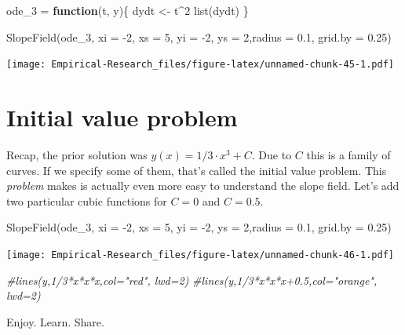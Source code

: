 \documentclass[
]{book}
\newenvironment{Shaded}{\begin{snugshade}}{\end{snugshade}}
\newcommand{\AttributeTok}[1]{\textcolor[rgb]{0.77,0.63,0.00}{#1}}
\newcommand{\CommentTok}[1]{\textcolor[rgb]{0.56,0.35,0.01}{\textit{#1}}}
\newcommand{\ControlFlowTok}[1]{\textcolor[rgb]{0.13,0.29,0.53}{\textbf{#1}}}
\newcommand{\DecValTok}[1]{\textcolor[rgb]{0.00,0.00,0.81}{#1}}
\newcommand{\FloatTok}[1]{\textcolor[rgb]{0.00,0.00,0.81}{#1}}
\newcommand{\FunctionTok}[1]{\textcolor[rgb]{0.00,0.00,0.00}{#1}}
\newcommand{\NormalTok}[1]{#1}
\newcommand{\OtherTok}[1]{\textcolor[rgb]{0.56,0.35,0.01}{#1}}
\newcommand{\SpecialCharTok}[1]{\textcolor[rgb]{0.00,0.00,0.00}{#1}}
\begin{document}
\begin{Shaded}
\begin{Highlighting}[]
\NormalTok{ode\_3 }\OtherTok{=} \ControlFlowTok{function}\NormalTok{(t, y)\{}
\NormalTok{  dydt }\OtherTok{\textless{}{-}}\NormalTok{ t}\SpecialCharTok{\^{}}\DecValTok{2}
  \FunctionTok{list}\NormalTok{(dydt)}
\NormalTok{\}}

\FunctionTok{SlopeField}\NormalTok{(ode\_3, }\AttributeTok{xi =} \SpecialCharTok{{-}}\DecValTok{2}\NormalTok{, }\AttributeTok{xs =} \DecValTok{5}\NormalTok{, }\AttributeTok{yi =} \SpecialCharTok{{-}}\DecValTok{2}\NormalTok{, }\AttributeTok{ys =} \DecValTok{2}\NormalTok{,}\AttributeTok{radius =} \FloatTok{0.1}\NormalTok{, }\AttributeTok{grid.by =} \FloatTok{0.25}\NormalTok{)}
\end{Highlighting}
\end{Shaded}

\texttt{[image: Empirical-Research\_files/figure-latex/unnamed-chunk-45-1.pdf]}

\hypertarget{initial-value-problem}{%
\section{Initial value problem}\label{initial-value-problem}}

Recap, the prior solution was \(y(x) = 1/3 \cdot x^3 + C\). Due to \(C\) this is a family of curves. If we specify some of them, that's called the initial value problem. This \emph{problem} makes is actually even more easy to understand the slope field. Let's add two particular cubic functions for \(C = 0\) and \(C = 0.5\).

\begin{Shaded}
\begin{Highlighting}[]
\FunctionTok{SlopeField}\NormalTok{(ode\_3, }\AttributeTok{xi =} \SpecialCharTok{{-}}\DecValTok{2}\NormalTok{, }\AttributeTok{xs =} \DecValTok{5}\NormalTok{, }\AttributeTok{yi =} \SpecialCharTok{{-}}\DecValTok{2}\NormalTok{, }\AttributeTok{ys =} \DecValTok{2}\NormalTok{,}\AttributeTok{radius =} \FloatTok{0.1}\NormalTok{, }\AttributeTok{grid.by =} \FloatTok{0.25}\NormalTok{)}
\end{Highlighting}
\end{Shaded}

\texttt{[image: Empirical-Research\_files/figure-latex/unnamed-chunk-46-1.pdf]}

\begin{Shaded}
\begin{Highlighting}[]
\CommentTok{\#lines(y,1/3*x*x*x,col="red", lwd=2)}
\CommentTok{\#lines(y,1/3*x*x*x+0.5,col="orange", lwd=2)}
\end{Highlighting}
\end{Shaded}

Enjoy. Learn. Share.

  
\end{document}
